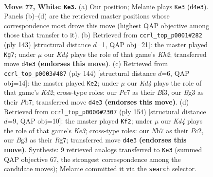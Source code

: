 \documentclass[11pt]{article}
\begin{document}
\clearpage

\begin{figure}[p]\centering
\begin{subfigure}{0.46\textwidth}\centering
\resizebox{\linewidth}{!}{%
\newchessgame
\chessboard[
  setfen={6k1/1NP5/2r5/8/3K4/6B1/8/8 w - - 67 77},
  showmover=false,
  pgfstyle=straightmove, color=movearrow, markmove={d4-e3}
]}
\caption{}
\end{subfigure}\hfill
\begin{subfigure}{0.46\textwidth}\centering
\resizebox{\linewidth}{!}{%
\newchessgame
\chessboard[
  setfen={8/7k/3n4/3b4/1R6/1p6/5K2/8 b - - 17 72},
  showmover=false,
  pgfstyle=straightmove, color=movearrow, markmove={h7-g7}
]}
\caption{}
\end{subfigure}
\\[4pt]
\begin{subfigure}{0.46\textwidth}\centering
\resizebox{\linewidth}{!}{%
\newchessgame
\chessboard[
  setfen={8/1P3p2/8/2k5/8/1r3B2/3K4/8 w - - 19 73},
  showmover=false,
  pgfstyle=straightmove, color=movearrow, markmove={d2-e2}
]}
\caption{}
\end{subfigure}\hfill
\begin{subfigure}{0.46\textwidth}\centering
\resizebox{\linewidth}{!}{%
\newchessgame
\chessboard[
  setfen={8/P5R1/2k5/8/r7/4K3/2P5/8 w - - 41 78},
  showmover=false,
  pgfstyle=straightmove, color=movearrow, markmove={e3-f2}
]}
\caption{}
\end{subfigure}
\caption{\textbf{Move 77, White: \texttt{Ke3}.} (a) Our position; Melanie plays \texttt{Ke3} (\texttt{d4e3}). Panels (b)--(d) are the retrieved master positions whose correspondence most drove this move (highest QAP objective among those that transfer to it). (b) Retrieved from \texttt{ccrl\_top\_p0001\#282} (ply 143) [structural distance $d$=1, QAP obj=21]: the master played \texttt{Kg7}; under $\mu$ our \emph{Kd4} plays the role of that game's \emph{Kh2}; transferred move \texttt{d4e3} \textbf{(endorses this move)}. (c) Retrieved from \texttt{ccrl\_top\_p0003\#487} (ply 144) [structural distance $d$=6, QAP obj=14]: the master played \texttt{Ke2}; under $\mu$ our \emph{Kd4} plays the role of that game's \emph{Kd2}; cross-type roles: our \emph{P}c7 as their \emph{B}f3, our \emph{B}g3 as their \emph{P}b7; transferred move \texttt{d4e3} \textbf{(endorses this move)}. (d) Retrieved from \texttt{ccrl\_top\_p0000\#2307} (ply 154) [structural distance $d$=9, QAP obj=10]: the master played \texttt{Kf2}; under $\mu$ our \emph{Kd4} plays the role of that game's \emph{Ke3}; cross-type roles: our \emph{N}b7 as their \emph{P}c2, our \emph{B}g3 as their \emph{R}g7; transferred move \texttt{d4e3} \textbf{(endorses this move)}. Synthesis: 9 retrieved analogs transferred to \texttt{Ke3} (summed QAP objective 67, the strongest correspondence among the candidate moves); Melanie committed it via the \texttt{search} selector.}
\label{fig:thought-m152}
\end{figure}
\end{document}
